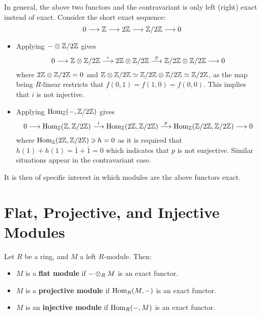 In general, the above two functors and the contravariant is only left (right) exact instead of exact. Consider the short exact sequence:
\[
    0 \longrightarrow \mathbb{Z} \longrightarrow 2\mathbb{Z} \longrightarrow \mathbb{Z}/2\mathbb{Z} \longrightarrow 0
\]
\begin{itemize}
    \item Applying $- \otimes \mathbb{Z}/2\mathbb{Z}$ gives
    \[
        0 \longrightarrow \mathbb{Z} \otimes \mathbb{Z}/2\mathbb{Z} \overset{i}{\longrightarrow} 2\mathbb{Z} \otimes \mathbb{Z}/2\mathbb{Z} \overset{p}{\longrightarrow} \mathbb{Z}/2\mathbb{Z} \otimes \mathbb{Z}/2\mathbb{Z} \longrightarrow 0
    \]
    where $2\mathbb{Z} \otimes \mathbb{Z}/2\mathbb{Z} = 0$ and $\mathbb{Z} \otimes \mathbb{Z}/2\mathbb{Z} \simeq \mathbb{Z}/2\mathbb{Z} \otimes \mathbb{Z}/2\mathbb{Z} \simeq \mathbb{Z}/2\mathbb{Z}$, as the map being $R$-linear restricts that $f(0, 1) = f(1, 0) = f(0, 0)$. This implies that $i$ is not injective.
    \item Applying $\mathrm{Hom}_{\mathbb{Z}}(-, \mathbb{Z}/2\mathbb{Z})$ gives
    \[
        0 \longrightarrow \mathrm{Hom}_{\mathbb{Z}}(\mathbb{Z}, \mathbb{Z}/2\mathbb{Z}) \overset{i}{\longrightarrow} \mathrm{Hom}_{\mathbb{Z}}(2\mathbb{Z}, \mathbb{Z}/2\mathbb{Z}) \overset{p}{\longrightarrow} \mathrm{Hom}_{\mathbb{Z}}(\mathbb{Z}/2\mathbb{Z}, \mathbb{Z}/2\mathbb{Z}) \longrightarrow 0
    \]
    where $\mathrm{Hom}_{\mathbb{Z}}(2\mathbb{Z}, \mathbb{Z}/2\mathbb{Z}) \ni h = 0$ as it is required that $h(1) + h(1) = \bar{1} + \bar{1} = 0$ which indicates that $p$ is not surjective. Similar situations appear in the contravariant case.
\end{itemize}

It is then of specific interest in which modules are the above functors exact.

\section{Flat, Projective, and Injective Modules}

\begin{definition}
    Let $R$ be a ring, and $M$ a left $R$-module. Then:
    \begin{itemize}
        \item $M$ is a \textbf{flat module} if $- \otimes_R M$ is an exact functor.
        \item $M$ is a \textbf{projective module} if $\mathrm{Hom}_R(M, -)$ is an exact functor.
        \item $M$ is an \textbf{injective module} if $\mathrm{Hom}_R(-, M)$ is an exact functor.
    \end{itemize}
\end{definition}


